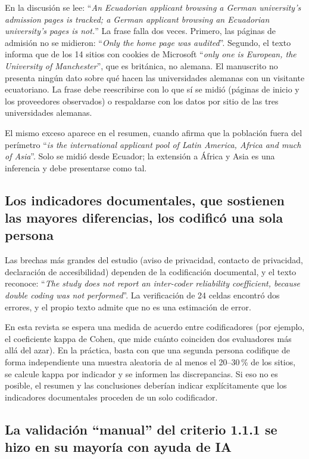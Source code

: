 \documentclass[11pt,a4paper]{article}
\newcommand{\cita}[1]{``\textit{#1}''}
\begin{document}
En la discusi\'on se lee: \cita{An Ecuadorian applicant browsing a German university's admission pages is tracked; a German applicant browsing an Ecuadorian university's pages is not.} La frase falla dos veces. Primero, las p\'aginas de admisi\'on no se midieron: \cita{Only the home page was audited}. Segundo, el texto informa que de los 14 sitios con cookies de Microsoft \cita{only one is European, the University of Manchester}, que es brit\'anica, no alemana. El manuscrito no presenta ning\'un dato sobre qu\'e hacen las universidades alemanas con un visitante ecuatoriano. La frase debe reescribirse con lo que s\'i se midi\'o (p\'aginas de inicio y los proveedores observados) o respaldarse con los datos por sitio de las tres universidades alemanas.

El mismo exceso aparece en el resumen, cuando afirma que la poblaci\'on fuera del per\'imetro \cita{is the international applicant pool of Latin America, Africa and much of Asia}. Solo se midi\'o desde Ecuador; la extensi\'on a \'Africa y Asia es una inferencia y debe presentarse como tal.

\subsection{Los indicadores documentales, que sostienen las mayores diferencias, los codific\'o una sola persona}

Las brechas m\'as grandes del estudio (aviso de privacidad, contacto de privacidad, declaraci\'on de accesibilidad) dependen de la codificaci\'on documental, y el texto reconoce: \cita{The study does not report an inter-coder reliability coefficient, because double coding was not performed}. La verificaci\'on de 24 celdas encontr\'o dos errores, y el propio texto admite que no es una estimaci\'on de error.

En esta revista se espera una medida de acuerdo entre codificadores (por ejemplo, el coeficiente kappa de Cohen, que mide cu\'anto coinciden dos evaluadores m\'as all\'a del azar). En la pr\'actica, basta con que una segunda persona codifique de forma independiente una muestra aleatoria de al menos el 20--30\,\% de los sitios, se calcule kappa por indicador y se informen las discrepancias. Si eso no es posible, el resumen y las conclusiones deber\'ian indicar expl\'icitamente que los indicadores documentales proceden de un solo codificador.

\subsection{La validaci\'on ``manual'' del criterio 1.1.1 se hizo en su mayor\'ia con ayuda de IA}
\end{document}

